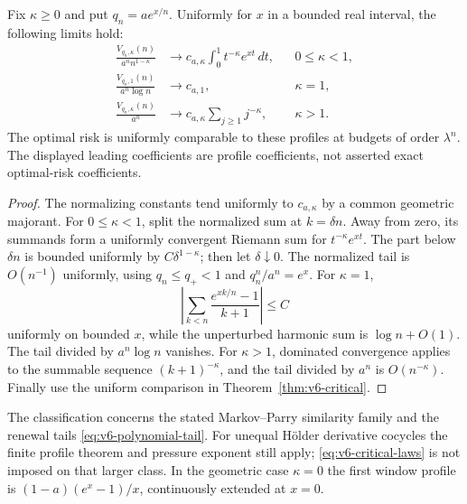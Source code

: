 \begin{theorem}\label{thm:v6-window}
Fix $\kappa\ge0$ and put $q_n=ae^{x/n}$. Uniformly for $x$ in a
bounded real interval, the following limits hold:
\begin{align}
 \frac{V_{q_n,\kappa}(n)}{a^n n^{1-\kappa}}
 &\longrightarrow c_{a,\kappa}\int_0^1 t^{-\kappa}e^{xt}\,dt,
                                      &&0\le\kappa<1,\label{eq:v6-window1}\\
 \frac{V_{q_n,1}(n)}{a^n\log n}&\longrightarrow c_{a,1},
                                      &&\kappa=1,\label{eq:v6-window2}\\
 \frac{V_{q_n,\kappa}(n)}{a^n}&\longrightarrow
                c_{a,\kappa}\sum_{j\ge1}j^{-\kappa},
                                      &&\kappa>1.\label{eq:v6-window3}
\end{align}
The optimal risk is uniformly comparable to these profiles at budgets
of order $\lambda^n$. The displayed leading coefficients are profile
coefficients, not asserted exact optimal-risk coefficients.
\end{theorem}
\begin{proof}
The normalizing constants tend uniformly to $c_{a,\kappa}$ by a
common geometric majorant. For $0\le\kappa<1$, split the normalized
sum at $k=\delta n$. Away from zero, its summands form a uniformly
convergent Riemann sum for $t^{-\kappa}e^{xt}$. The part below $\delta n$
is bounded uniformly by $C\delta^{1-\kappa}$; then let
$\delta\downarrow0$. The normalized tail is $O(n^{-1})$ uniformly,
using $q_n\le q_+<1$ and $q_n^n/a^n=e^x$.
For $\kappa=1$,
\[
 \left|\sum_{k<n}\frac{e^{xk/n}-1}{k+1}\right|\le C
\]
uniformly on bounded $x$, while the unperturbed harmonic sum is
$\log n+O(1)$. The tail divided by $a^n\log n$ vanishes.
For $\kappa>1$, dominated convergence applies to the summable sequence
$(k+1)^{-\kappa}$, and the tail divided by $a^n$ is $O(n^{-\kappa})$.
Finally use the uniform comparison in Theorem~\ref{thm:v6-critical}.
\end{proof}

The classification concerns the stated Markov--Parry similarity family
and the renewal tails \eqref{eq:v6-polynomial-tail}. For unequal
H\"older derivative cocycles the finite profile theorem and pressure
exponent still apply; \eqref{eq:v6-critical-laws} is not imposed on
that larger class. In the geometric case $\kappa=0$ the first window
profile is $(1-a)(e^x-1)/x$, continuously extended at $x=0$.
